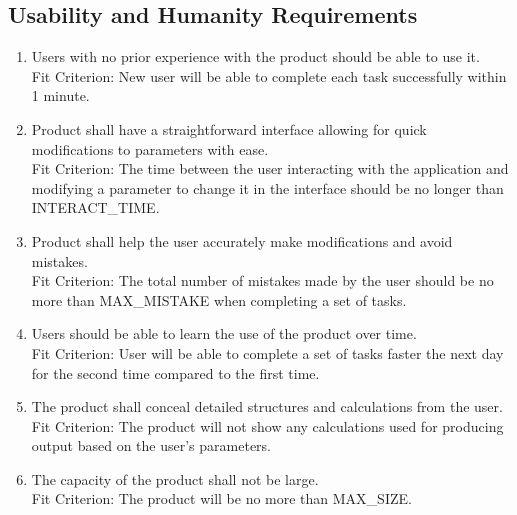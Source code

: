 \documentclass[12pt, titlepage]{article}
\begin{document}
\subsection{Usability and Humanity Requirements}
\begin{adjustwidth}{2.2em}{0pt}
\begin{enumerate}[{NFR-U}1.]
  \item Users with no prior experience with the product should be able to use it.\\ \label{NFR-U1}
  Fit Criterion: New user will be able to complete each task successfully within 1 minute. 
  \item Product shall have a straightforward interface allowing for quick modifications to parameters with ease.\\ \label{NFR-U2}
  Fit Criterion: The time between the user interacting with the application and modifying a parameter to change it in the interface should be no longer than INTERACT\_TIME.
  \item Product shall help the user accurately make modifications and avoid mistakes.\\ \label{NFR-U3}
  Fit Criterion: The total number of mistakes made by the user should be no more than MAX\_MISTAKE when completing a set of tasks. 
  \item Users should be able to learn the use of the product over time.\\ \label{NFR-U4}
  Fit Criterion: User will be able to complete a set of tasks faster the next day for the second time compared to the first time.
  \item The product shall conceal detailed structures and calculations from the user.\\ \label{NFR-U5}
  Fit Criterion: The product will not show any calculations used for producing output based on the user's parameters.
  \item The capacity of the product shall not be large.\\ \label{NFR-U6}
  Fit Criterion: The product will be no more than MAX\_SIZE.
\end{enumerate}
\end{adjustwidth}
\end{document}
